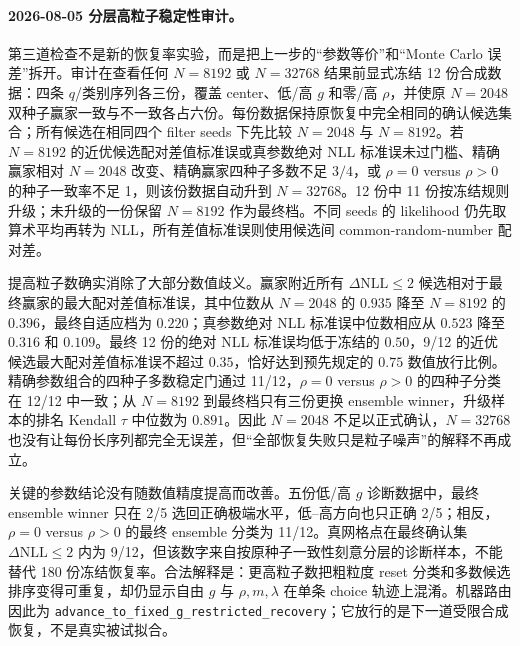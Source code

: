 \paragraph{2026-08-05 分层高粒子稳定性审计。}
第三道检查不是新的恢复率实验，而是把上一步的“参数等价”和“Monte Carlo 误差”拆开。审计在查看任何 $N=8192$ 或 $N=32768$ 结果前显式冻结 12 份合成数据：四条 $q$/类别序列各三份，覆盖 center、低/高 $g$ 和零/高 $\rho$，并使原 $N=2048$ 双种子赢家一致与不一致各占六份。每份数据保持原恢复中完全相同的确认候选集合；所有候选在相同四个 filter seeds 下先比较 $N=2048$ 与 $N=8192$。若 $N=8192$ 的近优候选配对差值标准误或真参数绝对 NLL 标准误未过门槛、精确赢家相对 $N=2048$ 改变、精确赢家四种子多数不足 $3/4$，或 $\rho=0$ versus $\rho>0$ 的种子一致率不足 1，则该份数据自动升到 $N=32768$。12 份中 11 份按冻结规则升级；未升级的一份保留 $N=8192$ 作为最终档。不同 seeds 的 likelihood 仍先取算术平均再转为 NLL，所有差值标准误则使用候选间 common-random-number 配对差。

提高粒子数确实消除了大部分数值歧义。赢家附近所有 $\Delta\mathrm{NLL}\leq2$ 候选相对于最终赢家的最大配对差值标准误，其中位数从 $N=2048$ 的 $0.935$ 降至 $N=8192$ 的 $0.396$，最终自适应档为 $0.220$；真参数绝对 NLL 标准误中位数相应从 $0.523$ 降至 $0.316$ 和 $0.109$。最终 12 份的绝对 NLL 标准误均低于冻结的 $0.50$，9/12 的近优候选最大配对差值标准误不超过 $0.35$，恰好达到预先规定的 $0.75$ 数值放行比例。精确参数组合的四种子多数稳定门通过 11/12，$\rho=0$ versus $\rho>0$ 的四种子分类在 12/12 中一致；从 $N=8192$ 到最终档只有三份更换 ensemble winner，升级样本的排名 Kendall $\tau$ 中位数为 $0.891$。因此 $N=2048$ 不足以正式确认，$N=32768$ 也没有让每份长序列都完全无误差，但“全部恢复失败只是粒子噪声”的解释不再成立。

关键的参数结论没有随数值精度提高而改善。五份低/高 $g$ 诊断数据中，最终 ensemble winner 只在 2/5 选回正确极端水平，低--高方向也只正确 2/5；相反，$\rho=0$ versus $\rho>0$ 的最终 ensemble 分类为 11/12。真网格点在最终确认集 $\Delta\mathrm{NLL}\leq2$ 内为 9/12，但该数字来自按原种子一致性刻意分层的诊断样本，不能替代 180 份冻结恢复率。合法解释是：更高粒子数把粗粒度 reset 分类和多数候选排序变得可重复，却仍显示自由 $g$ 与 $\rho,m,\lambda$ 在单条 choice 轨迹上混淆。机器路由因此为 \texttt{advance\_to\_fixed\_g\_restricted\_recovery}；它放行的是下一道受限合成恢复，不是真实被试拟合。


